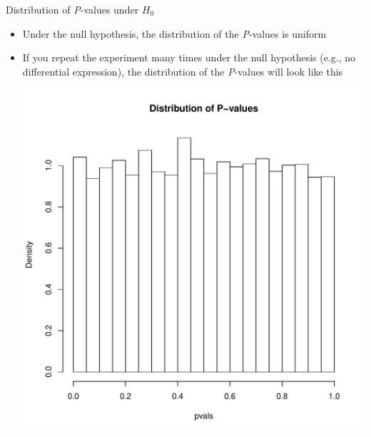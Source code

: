 \documentclass[xcolor=x11names,compress]{beamer}\usepackage[]{graphicx}\usepackage[]{color}
\newenvironment{knitrout}{}{} %
\begin{document}
\begin{frame}{Distribution of  {\it P}-values under $H_0$}
  \begin{itemize}
  \item Under the null hypothesis, the distribution of the
        {\it P}-values is uniform
  \item If you repeat the experiment many times under the null hypothesis
        (e.g., no differential expression), the distribution of the 
        {\it P}-values will look like this
\begin{knitrout}\tiny
{}\color{fgcolor}

{\centering \includegraphics[width=.6\linewidth]{figure/beamer-unnamed-chunk-17-1} 

}



\end{knitrout}
  \end{itemize}
\end{frame}
\end{document}
